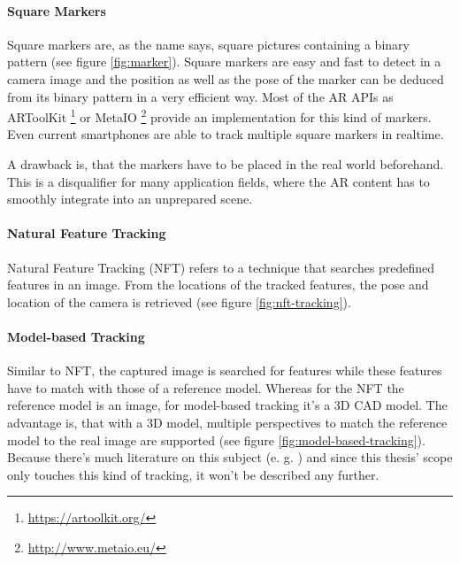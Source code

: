 \paragraph{Square Markers}
Square markers are, as the name says, square pictures containing a binary pattern (see figure \ref{fig:marker}). Square markers are easy and fast to detect in a camera image and the position as well as the pose of the marker can be deduced from its binary pattern in a very efficient way. Most of the AR APIs as ARToolKit \footnote{\url{https://artoolkit.org/}} or MetaIO \footnote{\url{http://www.metaio.eu/}} provide an implementation for this kind of markers. Even current smartphones are able to track multiple square markers in realtime.

A drawback is, that the markers have to be placed in the real world beforehand. This is a disqualifier for many application fields, where the AR content has to smoothly integrate into an unprepared scene.

\paragraph{Natural Feature Tracking}
Natural Feature Tracking (NFT) refers to a technique that searches predefined features in an image. From the locations of the tracked features, the pose and location of the camera is retrieved \citep{neumann1999natural} (see figure \ref{fig:nft-tracking}).

\paragraph{Model-based Tracking}
Similar to NFT, the captured image is searched for features while these features have to match with those of a reference model. Whereas for the NFT the reference model is an image, for model-based tracking it's a 3D CAD model. The advantage is, that with a 3D model, multiple perspectives to match the reference model to the real image are supported (see figure \ref{fig:model-based-tracking}).
Because there's much literature on this subject (e. g. \citep{lepetit2005monocular}) and since this thesis' scope only touches this kind of tracking, it won't be described any further.

